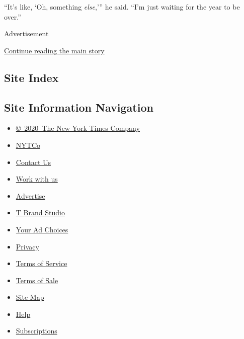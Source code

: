 ``It's like, `Oh, something \emph{else},''' he said. ``I'm just waiting
for the year to be over.''

Advertisement

\protect\hyperlink{after-bottom}{Continue reading the main story}

\hypertarget{site-index}{%
\subsection{Site Index}\label{site-index}}

\hypertarget{site-information-navigation}{%
\subsection{Site Information
Navigation}\label{site-information-navigation}}

\begin{itemize}
\tightlist
\item
  \href{https://help.nytimes3xbfgragh.onion/hc/en-us/articles/115014792127-Copyright-notice}{©~2020~The
  New York Times Company}
\end{itemize}

\begin{itemize}
\tightlist
\item
  \href{https://www.nytco.com/}{NYTCo}
\item
  \href{https://help.nytimes3xbfgragh.onion/hc/en-us/articles/115015385887-Contact-Us}{Contact
  Us}
\item
  \href{https://www.nytco.com/careers/}{Work with us}
\item
  \href{https://nytmediakit.com/}{Advertise}
\item
  \href{http://www.tbrandstudio.com/}{T Brand Studio}
\item
  \href{https://www.nytimes3xbfgragh.onion/privacy/cookie-policy\#how-do-i-manage-trackers}{Your
  Ad Choices}
\item
  \href{https://www.nytimes3xbfgragh.onion/privacy}{Privacy}
\item
  \href{https://help.nytimes3xbfgragh.onion/hc/en-us/articles/115014893428-Terms-of-service}{Terms
  of Service}
\item
  \href{https://help.nytimes3xbfgragh.onion/hc/en-us/articles/115014893968-Terms-of-sale}{Terms
  of Sale}
\item
  \href{https://spiderbites.nytimes3xbfgragh.onion}{Site Map}
\item
  \href{https://help.nytimes3xbfgragh.onion/hc/en-us}{Help}
\item
  \href{https://www.nytimes3xbfgragh.onion/subscription?campaignId=37WXW}{Subscriptions}
\end{itemize}
